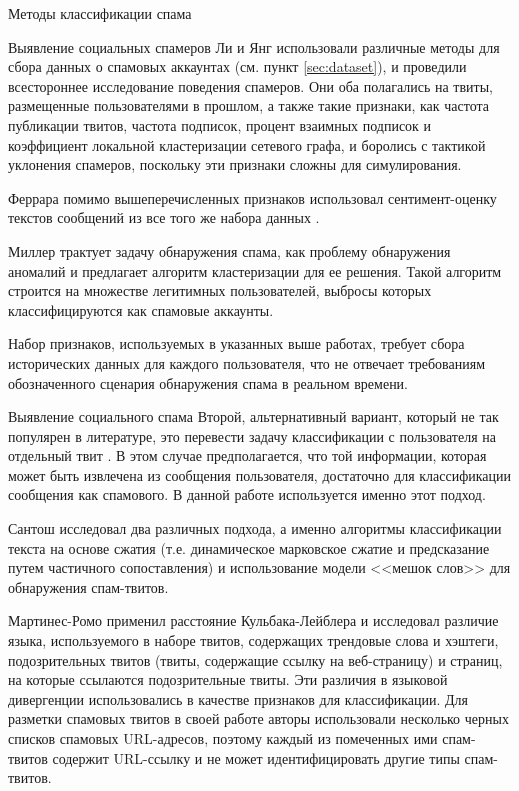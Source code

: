 \begin{section}{Методы классификации спама}
\begin{subsection}{Выявление социальных спамеров}
  Ли \cite{Lee} и Янг \cite{Yang} использовали различные методы для сбора данных о  спамовых аккаунтах (см. пункт \ref{sec:dataset}),
  и проведили всестороннее исследование поведения спамеров. Они оба полагались на твиты, размещенные пользователями в прошлом,
  а также такие признаки, как частота публикации твитов, частота подписок, процент взаимных подписок и коэффициент локальной кластеризации сетевого графа, и боролись с тактикой уклонения спамеров, поскольку эти признаки сложны для симулирования.

  Феррара \cite{Ferrara} помимо вышеперечисленных признаков использовал сентимент-оценку текстов сообщений из все того же набора данных \cite{Lee}.

  Миллер \cite{Miller} трактует задачу обнаружения спама, как проблему обнаружения аномалий и предлагает алгоритм кластеризации для ее решения.
  Такой алгоритм строится на множестве легитимных пользователей, выбросы которых классифицируются как спамовые аккаунты.

  Набор признаков, используемых в указанных выше работах, требует сбора исторических данных для каждого пользователя, что не отвечает требованиям обозначенного сценария обнаружения спама в реальном времени.
\end{subsection}

\begin{subsection}{Выявление социального спама}
Второй, альтернативный вариант, который не так популярен в литературе,
это перевести задачу классификации с пользователя на отдельный твит \cite{Benevenuto}.
В этом случае предполагается, что той информации, которая может быть извлечена из сообщения пользователя,
достаточно для классификации сообщения как спамового. В данной работе используется именно этот подход.

Сантош \cite{Santos} исследовал два различных подхода, а именно алгоритмы классификации текста на основе сжатия (т.е. динамическое марковское сжатие и предсказание путем частичного сопоставления) и использование модели <<мешок слов>> для обнаружения спам-твитов.

Мартинес-Ромо \cite{Martinez} применил расстояние Кульбака-Лейблера и исследовал различие языка, используемого в наборе твитов, содержащих трендовые слова и хэштеги, подозрительных твитов (твиты, содержащие ссылку на веб-страницу) и страниц, на которые ссылаются подозрительные твиты.
Эти различия в языковой дивергенции использовались в качестве признаков для классификации.
Для разметки спамовых твитов в своей работе авторы использовали несколько черных списков спамовых URL-адресов, поэтому каждый из помеченных ими спам-твитов содержит URL-ссылку и не может идентифицировать другие типы спам-твитов.


\end{subsection}
\end{section}
